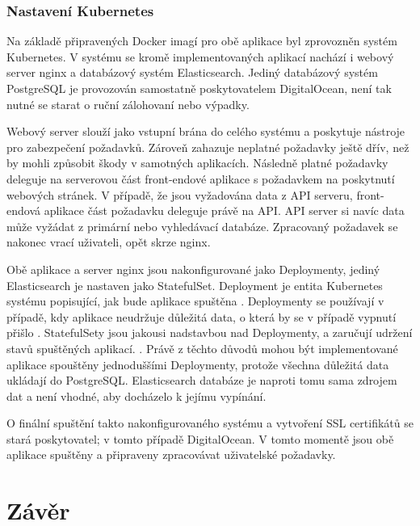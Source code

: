 		\subsubsection{Nastavení Kubernetes}

		Na základě připravených Docker imagí pro obě aplikace byl zprovozněn systém Kubernetes.
		V systému se kromě implementovaných aplikací nachází i webový server nginx a databázový systém Elasticsearch.
		Jediný databázový systém PostgreSQL je provozován samostatně poskytovatelem DigitalOcean,
		není tak nutné se starat o ruční zálohovaní nebo výpadky.


		Webový server slouží jako vstupní brána do celého systému a poskytuje nástroje pro zabezpečení požadavků.
		Zároveň zahazuje neplatné požadavky ještě dřív, než by mohli způsobit škody v samotných aplikacích.
		Následně platné požadavky deleguje na serverovou část front-endové aplikace s požadavkem na poskytnutí webových stránek.
		V případě, že jsou vyžadována data z API serveru, front-endová aplikace část požadavku deleguje právě na \ac{API}.
		\ac{API} server si navíc data může vyžádat z primární nebo vyhledávací databáze.
		Zpracovaný požadavek se nakonec vrací uživateli, opět skrze nginx.

		Obě aplikace a server nginx jsou nakonfigurované jako Deploymenty, jediný Elasticsearch je nastaven jako StatefulSet.
		Deployment je entita Kubernetes systému popisující, jak bude aplikace spuštěna \cite{deployements}.
		Deploymenty se používají v případě, kdy aplikace neudržuje důležitá data, o která by se v případě vypnutí přišlo
		\cite{deployements}.
		StatefulSety jsou jakousi nadstavbou nad Deploymenty, a zaručují udržení stavů spuštěných aplikací. \cite{statefulsets}.
		Právě z těchto důvodů mohou být implementované aplikace spouštěny jednoduššími Deploymenty, protože všechna důležitá
		data ukládají do PostgreSQL.
		Elasticsearch databáze je naproti tomu sama zdrojem dat a není vhodné, aby docházelo k jejímu vypínání.

		O finální spuštění takto nakonfigurovaného systému a vytvoření SSL certifikátů se stará poskytovatel; v tomto případě DigitalOcean.
		V tomto momentě jsou obě aplikace spuštěny a připraveny zpracovávat uživatelské požadavky.

\section{Závěr}

